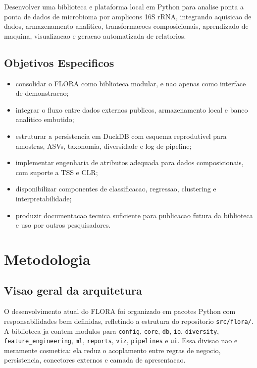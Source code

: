 \documentclass[12pt,a4paper]{article}
\begin{document}
Desenvolver uma biblioteca e plataforma local em Python para analise ponta a ponta de dados de microbioma por amplicons 16S rRNA, integrando aquisicao de dados, armazenamento analitico, transformacoes composicionais, aprendizado de maquina, visualizacao e geracao automatizada de relatorios.

\subsection{Objetivos Especificos}

\begin{itemize}[leftmargin=1.5cm]
    \item consolidar o FLORA como biblioteca modular, e nao apenas como interface de demonstracao;
    \item integrar o fluxo entre dados externos publicos, armazenamento local e banco analitico embutido;
    \item estruturar a persistencia em DuckDB com esquema reprodutivel para amostras, ASVs, taxonomia, diversidade e log de pipeline;
    \item implementar engenharia de atributos adequada para dados composicionais, com suporte a TSS e CLR;
    \item disponibilizar componentes de classificacao, regressao, clustering e interpretabilidade;
    \item produzir documentacao tecnica suficiente para publicacao futura da biblioteca e uso por outros pesquisadores.
\end{itemize}

\section{Metodologia}

\subsection{Visao geral da arquitetura}

O desenvolvimento atual do FLORA foi organizado em pacotes Python com responsabilidades bem definidas, refletindo a estrutura do repositorio \texttt{src/flora/}. A biblioteca ja contem modulos para \texttt{config}, \texttt{core}, \texttt{db}, \texttt{io}, \texttt{diversity}, \texttt{feature\_engineering}, \texttt{ml}, \texttt{reports}, \texttt{viz}, \texttt{pipelines} e \texttt{ui}. Essa divisao nao e meramente cosmetica: ela reduz o acoplamento entre regras de negocio, persistencia, conectores externos e camada de apresentacao.
\end{document}
